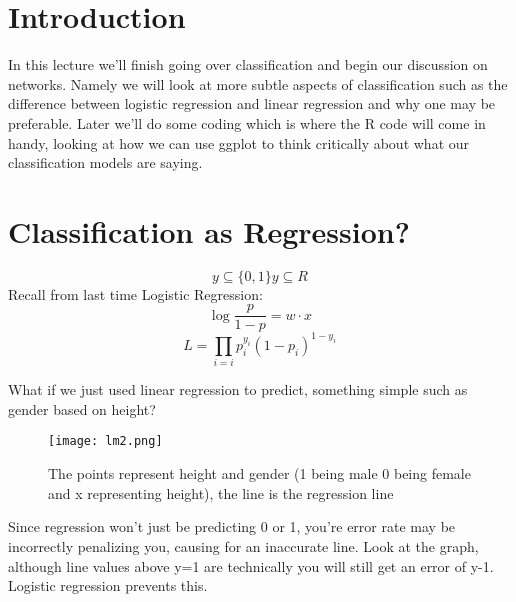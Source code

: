 
\section{Introduction}
In  this lecture we'll finish going over classification and begin our discussion on networks. Namely we will look at more subtle aspects of classification such as the difference between logistic regression and linear regression and why one may be preferable. Later we'll do some coding which is where the R code will come in handy, looking at how we can use ggplot to think critically about what our classification models are saying. 

\section{Classification as Regression?}
\begin{equation}
   y\subseteq \{0,1\} y\subseteq R 
\end{equation}
Recall from last time Logistic Regression: 
\begin{equation}
    \log\frac{p}{1-p}=w\cdot x
\end{equation}
\begin{equation}
    L=\prod_{i=i} p_i^{y_i}(1-p_i)^{1-y_i}
\end{equation}

What if we just used linear regression to predict, something simple such as gender based on height? 
\begin{figure}[ht]
  \begin{center}
 \texttt{[image: lm2.png]}
 \caption{The points represent height and gender (1 being male 0 being female and x representing height), the line is the regression line}
 \end{center}
 \end{figure}
 
 Since regression won't just be predicting 0 or 1, you're error rate may be incorrectly penalizing you, causing for an inaccurate line. Look at the graph, although line  values above y=1 are technically you will still get an error of y-1. Logistic regression prevents this. 


